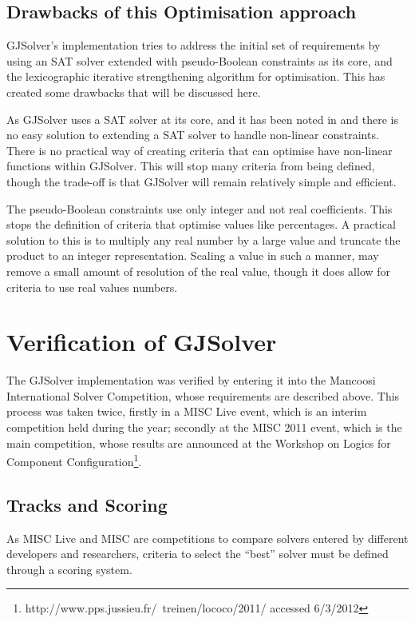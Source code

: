 \subsection{Drawbacks of this Optimisation approach}
GJSolver's implementation tries to address the initial set of requirements by using an SAT solver extended with pseudo-Boolean constraints as its core,
and the lexicographic iterative strengthening algorithm for optimisation.
This has created some drawbacks that will be discussed here.

As GJSolver uses a SAT solver at its core, 
and it has been noted in \citep{le_berre_dependency_2009} and \citep{leBerre2010} there is no easy solution to extending a SAT solver to handle non-linear constraints.
There is no practical way of creating criteria that can optimise have non-linear functions within GJSolver.
This will stop many criteria from being defined, though the trade-off is that GJSolver will remain relatively simple and efficient.

The pseudo-Boolean constraints use only integer and not real coefficients.
This stops the definition of criteria that optimise values like percentages.
A practical solution to this is to multiply any real number by a large value and truncate the product to an integer representation.
Scaling a value in such a manner, may remove a small amount of resolution of the real value, though it does allow for criteria to use real values numbers.

\section{Verification of GJSolver}
\label{impl.verif}
The GJSolver implementation was verified by entering it into the Mancoosi International Solver Competition, whose requirements are described above.
This process was taken twice, firstly in a MISC Live event, which is an interim competition held during the year;
secondly at the MISC 2011 event, 
which is the main competition, whose results are announced at the Workshop on Logics for Component Configuration\footnote{http://www.pps.jussieu.fr/~treinen/lococo/2011/ accessed 6/3/2012}.

\subsection{Tracks and Scoring}
As MISC Live and MISC are competitions to compare solvers entered by different developers and researchers,
criteria to select the ``best'' solver must be defined through a scoring system.

